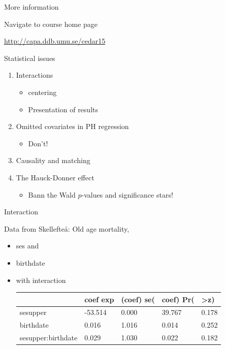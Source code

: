 \begin{frame}{More information}

Navigate to course home page

\href{http://capa.ddb.umu.se/cedar15}{\url{http://capa.ddb.umu.se/cedar15}}

\end{frame}

\begin{frame}{Statistical issues}

\begin{enumerate}
\def\labelenumi{\arabic{enumi}.}
\itemsep1pt\parskip0pt
\item
  Interactions

  \begin{itemize}
  \itemsep1pt\parskip0pt
  \item
    centering
  \item
    Presentation of results
  \end{itemize}
\item
  Omitted covariates in PH regression

  \begin{itemize}
  \itemsep1pt\parskip0pt
  \item
    Don't!
  \end{itemize}
\item
  Causality and matching
\item
  The Hauck-Donner effect

  \begin{itemize}
  \itemsep1pt\parskip0pt
  \item
    Bann the Wald \(p\)-values and significance stars!
  \end{itemize}
\end{enumerate}

\end{frame}

\begin{frame}{Interaction}

Data from Skellefteå: Old age mortality,

\begin{itemize}
\item
  ses and
\item
  birthdate
\item
  with interaction

  \begin{longtable}[c]{@{}lllll@{}}
  \toprule
  & coef exp & (coef) se( & coef) Pr( &
  \textgreater{}\textbar{}z\textbar{})\tabularnewline
  \midrule
  \endhead
  sesupper & -53.514 & 0.000 & 39.767 & 0.178\tabularnewline
  birthdate & 0.016 & 1.016 & 0.014 & 0.252\tabularnewline
  sesupper:birthdate & 0.029 & 1.030 & 0.022 & 0.182\tabularnewline
  \bottomrule
  \end{longtable}
\end{itemize}

\end{frame}

